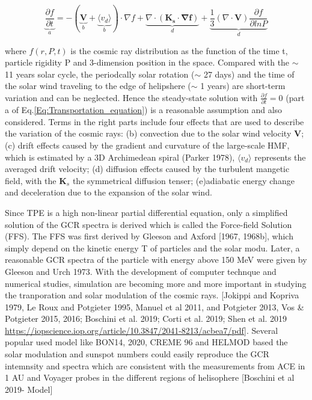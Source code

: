 	\begin{equation}
		\underbrace{\frac{\partial f}{\partial t}}_{a} = - ( \underbrace{\boldsymbol{V}}_{b} + \underbrace{\langle v_d \rangle }_{b}) \cdot \nabla f + \underbrace{\nabla \cdot (\boldsymbol{K_s \cdot \nabla f})}_{d} + \underbrace{\frac{1}{3}(\nabla \cdot \boldsymbol{V}) \frac{\partial f}{\partial ln P}}_{d}
		\label{Eq:Transportation_equation}
	\end{equation}

where $f(r, P, t)$ is the cosmic ray distribution as the function of the time t, particle rigidity P and 3-dimension position in the space. Compared with the $\sim$ 11 years solar cycle, the periodcally solar rotation ($\sim$ 27 days) and  the time of the solar wind traveling to the edge of helipshere ($\sim$ 1 years) are short-term variation and can be neglected. Hence the steady-state solution with  $\frac{\partial f}{\partial t} = 0$ (part a of Eq.\ref{Eq:Transportation_equation}) is a reasonable assumption and also considered. Terms in the right parts include four effects that are used to describe the variation of the cosmic rays: (b) convection due to the solar wind velocity $\boldsymbol{V}$; (c) drift effects caused by the gradient and curvature of the large-scale \ac{HMF}, which is estimated by a 3D Archimedean spiral (Parker 1978), $\langle v_d \rangle$ represents the averaged drift velocity; (d) diffusion effects caused by the turbulent mangetic field, with the $\boldsymbol{K}_s$ the symmetrical diffusion tenser; (e)adiabatic energy change and deceleration due to the expansion of the solar wind. 

Since TPE is a high non-linear partial differential equation, only a simplified solution of the GCR spectra is derived which is called the Force-field Solution (FFS). The FFS was first derived by Gleeson and Axford [1967, 1968b], which simply depend on the kinetic energy T of particles and the solar modu. Later, a reasonable GCR spectra of the particle with energy above 150 MeV were given by Gleeson and Urch 1973.
With the development of computer technque and numerical studies, simulation are becoming more and more important in studying the tranporation and solar modulation of the cosmic rays. [Jokippi and Kopriva 1979, Le Roux and Potgieter 1995, Manuel et al 2011, and Potgieter 2013, Vos \& Potgieter 2015, 2016; Boschini et al. 2019;
Corti et al. 2019; Shen et al. 2019 \url{https://iopscience.iop.org/article/10.3847/2041-8213/acbea7/pdf}]. 
Several popular used model like BON14, 2020, CREME 96 and HELMOD based the solar modulation and sunspot numbers could easily reproduce the GCR intemnsity and spectra which are consistent with the measurements from \ac{ACE} in 1 AU and Voyager probes in the different regions of helisophere [Boschini et al 2019- Model]


